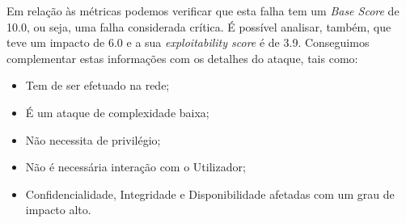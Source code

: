 \documentclass[11t]{article}
\begin{document}
\vspace{0.4cm}

\par Em relação às métricas podemos verificar que esta falha tem um \textit{Base Score} de 10.0, ou seja, uma falha considerada crítica. É possível analisar, também, que teve um impacto de 6.0 e a sua \textit{exploitability score} é de 3.9. Conseguimos complementar estas informações com os detalhes do ataque, tais como:

\begin{itemize}
    \item Tem de ser efetuado na rede;
    \item É um ataque de complexidade baixa;
    \item Não necessita de privilégio;
    \item Não é necessária interação com o Utilizador;
    \item Confidencialidade, Integridade e Disponibilidade afetadas com um grau de impacto alto.
\end{itemize}
\end{document}
